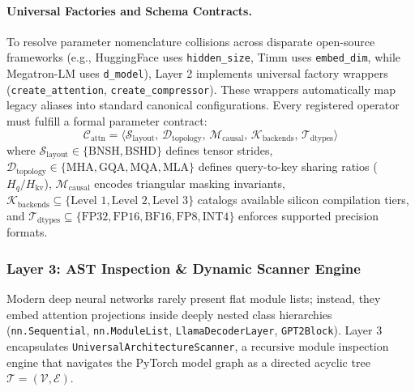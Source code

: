 \paragraph{Universal Factories and Schema Contracts.} To resolve parameter nomenclature collisions across disparate open-source frameworks (e.g., HuggingFace uses \texttt{hidden\_size}, Timm uses \texttt{embed\_dim}, while Megatron-LM uses \texttt{d\_model}), Layer 2 implements universal factory wrappers (\texttt{create\_attention}, \texttt{create\_compressor}). These wrappers automatically map legacy aliases into standard canonical configurations. Every registered operator must fulfill a formal parameter contract:
\begin{equation}
    \mathcal{C}_{\text{attn}} = \big\langle \mathcal{S}_{\text{layout}}, \, \mathcal{D}_{\text{topology}}, \, \mathcal{M}_{\text{causal}}, \, \mathcal{K}_{\text{backends}}, \, \mathcal{T}_{\text{dtypes}} \big\rangle
    \label{eq:contract_spec_layer2}
\end{equation}
where $\mathcal{S}_{\text{layout}} \in \{\text{BNSH}, \text{BSHD}\}$ defines tensor strides, $\mathcal{D}_{\text{topology}} \in \{\text{MHA}, \text{GQA}, \text{MQA}, \text{MLA}\}$ defines query-to-key sharing ratios ($H_q / H_{\text{kv}}$), $\mathcal{M}_{\text{causal}}$ encodes triangular masking invariants, $\mathcal{K}_{\text{backends}} \subseteq \{\text{Level 1}, \text{Level 2}, \text{Level 3}\}$ catalogs available silicon compilation tiers, and $\mathcal{T}_{\text{dtypes}} \subseteq \{\text{FP32}, \text{FP16}, \text{BF16}, \text{FP8}, \text{INT4}\}$ enforces supported precision formats.

\subsubsection{Layer 3: AST Inspection \& Dynamic Scanner Engine}
Modern deep neural networks rarely present flat module lists; instead, they embed attention projections inside deeply nested class hierarchies (\texttt{nn.Sequential}, \texttt{nn.ModuleList}, \linebreak \texttt{LlamaDecoderLayer}, \texttt{GPT2Block}). Layer 3 encapsulates \texttt{UniversalArchitectureScanner}, a recursive module inspection engine that navigates the PyTorch model graph as a directed acyclic tree $\mathcal{T} = (\mathcal{V}, \mathcal{E})$.

